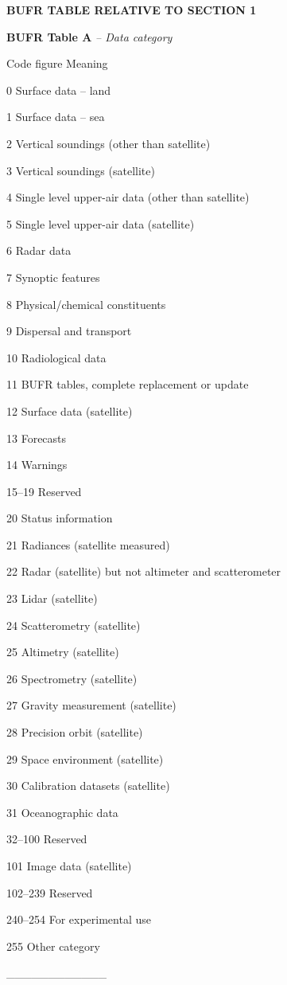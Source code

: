 \textbf{BUFR TABLE RELATIVE TO SECTION 1}

\textbf{BUFR Table A} \emph{-- Data category}

Code figure Meaning

0 Surface data -- land

1 Surface data -- sea

2 Vertical soundings (other than satellite)

3 Vertical soundings (satellite)

4 Single level upper-air data (other than satellite)

5 Single level upper-air data (satellite)

6 Radar data

7 Synoptic features

8 Physical/chemical constituents

9 Dispersal and transport

10 Radiological data

11 BUFR tables, complete replacement or update

12 Surface data (satellite)

13 Forecasts

14 Warnings

15--19 Reserved

20 Status information

21 Radiances (satellite measured)

22 Radar (satellite) but not altimeter and scatterometer

23 Lidar (satellite)

24 Scatterometry (satellite)

25 Altimetry (satellite)

26 Spectrometry (satellite)

27 Gravity measurement (satellite)

28 Precision orbit (satellite)

29 Space environment (satellite)

30 Calibration datasets (satellite)

31 Oceanographic data

32--100 Reserved

101 Image data (satellite)

102--239 Reserved

240--254 For experimental use

255 Other category

\_\_\_\_\_\_\_\_\_\_\_\_
